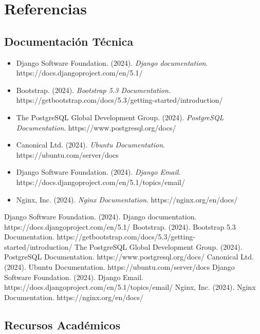 \chapter{Referencias}
\section{Documentación Técnica}

\begin{itemize}
	\item Django Software Foundation. (2024). \textit{Django documentation}. https://docs.djangoproject.com/en/5.1/ \cite{django-docs}
	\item Bootstrap. (2024). \textit{Bootstrap 5.3 Documentation}. https://getbootstrap.com/docs/5.3/getting-started/introduction/ \cite{bootstrap-docs}
	\item The PostgreSQL Global Development Group. (2024). \textit{PostgreSQL Documentation}. https://www.postgresql.org/docs/ \cite{postgresql-docs}
	\item Canonical Ltd. (2024). \textit{Ubuntu Documentation}. https://ubuntu.com/server/docs \cite{ubuntu-docs}
	\item Django Software Foundation. (2024). \textit{Django Email}. https://docs.djangoproject.com/en/5.1/topics/email/ \cite{django-email}
	\item Nginx, Inc. (2024). \textit{Nginx Documentation}. https://nginx.org/en/docs/ \cite{nginx-docs}
\end{itemize}
\begin{thebibliography}{{}}
 Django Software Foundation. (2024). Django documentation. https://docs.djangoproject.com/en/5.1/
 Bootstrap. (2024). Bootstrap 5.3 Documentation. https://getbootstrap.com/docs/5.3/getting-started/introduction/
 The PostgreSQL Global Development Group. (2024). PostgreSQL Documentation. https://www.postgresql.org/docs/
 Canonical Ltd. (2024). Ubuntu Documentation. https://ubuntu.com/server/docs
 Django Software Foundation. (2024). Django Email. https://docs.djangoproject.com/en/5.1/topics/email/
 Nginx, Inc. (2024). Nginx Documentation. https://nginx.org/en/docs/
\end{thebibliography}
\section{Recursos Académicos}
